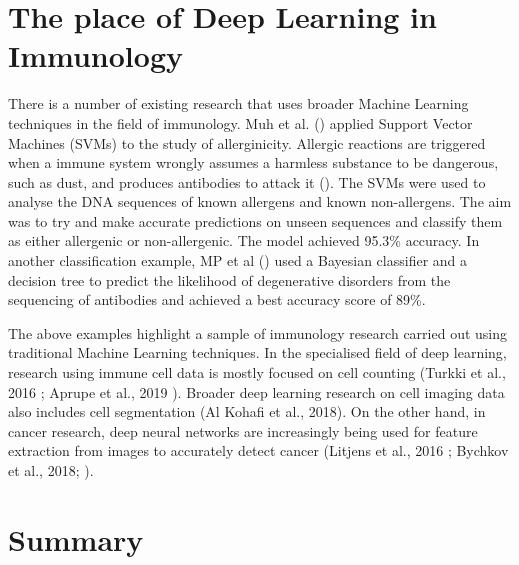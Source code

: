\section{The place of Deep Learning in Immunology}

There is a number of existing research that uses broader Machine Learning techniques in the field of immunology. Muh et al. (\cite{https://www.ncbi.nlm.nih.gov/pubmed/19516900/}) applied Support Vector Machines (SVMs) to the study of allerginicity. Allergic reactions are triggered when a immune system wrongly assumes a harmless substance to be dangerous, such as dust, and produces antibodies to attack it  (\cite{https://www.immunology.org/policy-and-public-affairs/briefings-and-position-statements/allergy}). The SVMs were used to analyse the DNA sequences of known allergens and known non-allergens. The aim was to try and make accurate predictions on unseen sequences and classify them as either allergenic or non-allergenic. The model achieved 95.3\% accuracy.  In another classification example, MP et al (\cite{https://www.ncbi.nlm.nih.gov/pubmed/20144194/}) used a Bayesian classifier and a decision tree to predict the likelihood of degenerative disorders from the sequencing of antibodies and achieved a best accuracy score of 89\%.

The above examples highlight a sample of immunology research carried out using traditional Machine Learning techniques. In the specialised field of deep learning, research using immune cell data is mostly focused on cell counting (Turkki et al., 2016 \cite{https://www.ncbi.nlm.nih.gov/pmc/articles/PMC5027738/}; Aprupe et al., 2019 \cite{https://www.ncbi.nlm.nih.gov/pmc/articles/PMC6462181/}). Broader deep learning research on cell imaging data also includes cell segmentation (Al Kohafi et al., 2018). On the other hand, in cancer research, deep neural networks are increasingly being used for feature extraction from images to accurately detect cancer (Litjens et al., 2016 \cite{https://www.ncbi.nlm.nih.gov/pmc/articles/PMC4876324/}; Bychkov et al., 2018; \cite{https://www.ncbi.nlm.nih.gov/pmc/articles/PMC5821847/}).

\section{Summary}

